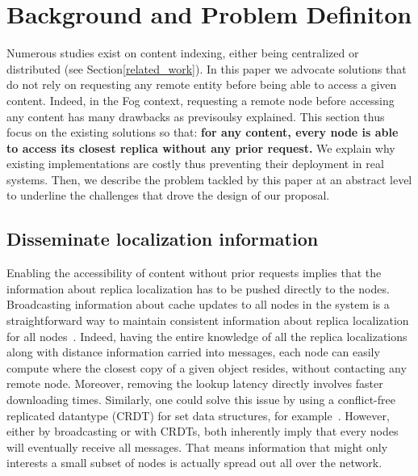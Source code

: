 \section{Background and Problem Definiton}
\label{sec:background}

Numerous studies exist on content indexing, either being centralized or distributed (see Section\ref{related_work}). In this paper
we advocate solutions that do not rely on requesting any remote entity before being able to access a given content. 
Indeed, in the Fog context, requesting a remote node before accessing any content has many drawbacks as previsoulsy explained.
This section thus focus on the existing solutions so that: \textbf{for any content, every node is able to access its closest replica without any prior request.}
We explain why existing implementations are costly thus preventing their deployment in real systems.
Then, we describe the problem tackled by this paper at an abstract level to underline the challenges that drove the design of our proposal. 


\subsection*{Disseminate localization information}
Enabling the accessibility of content without prior requests implies that the information about replica localization has to be pushed directly to the nodes.
Broadcasting information about cache updates to all nodes in the system is a straightforward way to maintain consistent information about replica localization for all nodes~\cite{nlsr,lscr}. Indeed, having the entire knowledge of all the replica localizations along with distance information carried into messages, each node can easily compute where the closest copy of a given object resides, without contacting any remote node. Moreover, removing the lookup latency directly involves faster downloading times. 
Similarly, one could solve this issue by using a conflict-free replicated datantype (CRDT) for set data structures, for example~\cite{shapiro2011crdts}. 
However, either by broadcasting or with CRDTs, both inherently imply that every nodes will eventually receive all messages. 
That means information that might only interests a small subset of nodes is actually spread out all over the network. 



